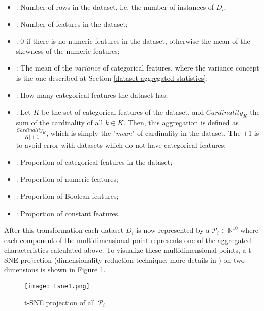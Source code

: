 \begin{itemize}
    \item \textbf{}: Number of rows in the dataset, i.e. the number of instances of $D_i$;
    \item \textbf{}: Number of features in the dataset;
    \item \textbf{}: $0$ if there is no numeric features in the dataset, otherwise the mean of the skewness of the numeric features;
    \item \textbf{}: The mean of the \textit{variance} of categorical features, where the variance concept is the one described at Section \ref{dataset-aggregated-statistics};
    \item \textbf{}: How many categorical features the dataset has;
    \item \textbf{}: Let $K$ be the set of categorical features of the dataset, and $Cardinality_K$ the sum of the cardinality of all $k\in K$. Then, this aggregation is defined as $\frac{Cardinality_K}{|K| + 1}$, which is simply the "\textit{mean}" of cardinality in the dataset. The $+1$ is to avoid error with datasets which do not have categorical features;
    \item \textbf{}: Proportion of categorical features in the dataset;
    \item \textbf{}: Proportion of numeric features;
    \item \textbf{}: Proportion of Boolean features;
    \item \textbf{}: Proportion of constant features.
\end{itemize}


After this transformation each dataset $D_i$ is now represented by a $\mathcal{P}_i \in \mathbb{R}^{10}$ where each component of the multidimensional point represents one of the aggregated characteristics calculated above. To visualize these multidimensional points, a t-SNE projection (dimensionality reduction technique, more details in \cite{maaten2008visualizing}) on two dimensions is shown in Figure \ref{fig:tsne-1}.

\begin{figure}[!h]
    \centering
    \texttt{[image: tsne1.png]}
    \caption{t-SNE projection of all $\mathcal{P}_i$}
    \label{fig:tsne-1}
\end{figure}

